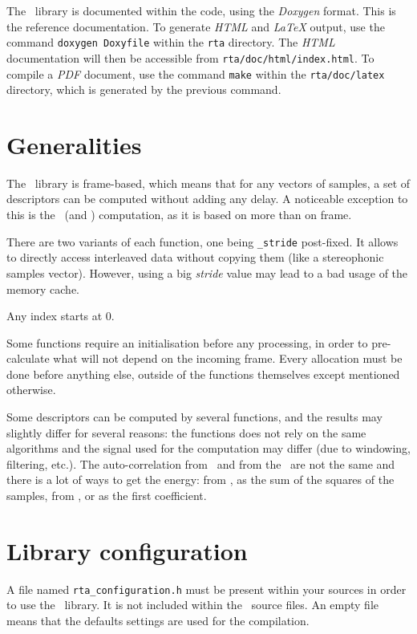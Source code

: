\documentclass[a4paper, twoside]{article}
\begin{document}
The \rta\ library is documented within the code, using the
\textit{Doxygen} format. This is the reference documentation. To
generate \textit{HTML} and \textit{LaTeX} output, use the command
\texttt{doxygen Doxyfile} within the \texttt{rta} directory.  The
\textit{HTML} documentation will then be accessible from
\texttt{rta/doc/html/index.html}. To compile a \textit{PDF} document,
use the command \texttt{make} within the \texttt{rta/doc/latex}
directory, which is generated by the previous command.

\section{Generalities}
\label{sec:generalities}

The \rta\ library is frame-based, which means that for any vectors of
samples, a set of descriptors can be computed without adding any
delay. A noticeable exception to this is the \del\ (and
\ddel) computation, as it is based on more than on frame.

There are two variants of each function, one being \texttt{\_stride}
post-fixed. It allows to directly access interleaved data without
copying them (like a stereophonic samples vector). However, using a
big \emph{stride} value may lead to a bad usage of the memory cache.

Any index starts at 0.

Some functions require an initialisation before any processing, in
order to pre-calculate what will not depend on the incoming
frame. Every allocation must be done before anything else, outside of
the functions themselves except mentioned otherwise.

Some descriptors can be computed by several functions, and the results
may slightly differ for several reasons: the functions does not rely
on the same algorithms and the signal used for the computation may
differ (due to windowing, filtering, etc.). The auto-correlation from
\yin\ and from the \lpc\ are not the same and there is a
lot of ways to get the energy: from \yin, as the sum of the
squares of the samples, from \lpc, or as the first
\mfcc coefficient.

\section{Library configuration}
\label{sec:configuration}

A file named \texttt{rta\_configuration.h} must be present within your
sources in order to use the \rta\ library. It is not included within
the \rta\ source files. An empty file means that the defaults settings
are used for the compilation.
\end{document}

